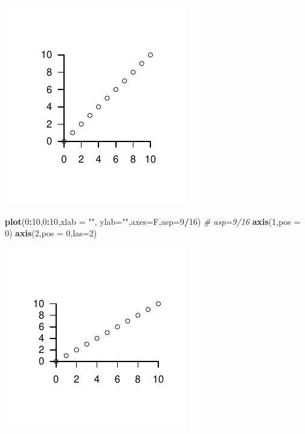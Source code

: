 \documentclass[
  11pt,
]{book}
\newenvironment{Shaded}{\begin{snugshade}}{\end{snugshade}}
\newcommand{\AttributeTok}[1]{\textcolor[rgb]{0.13,0.29,0.53}{#1}}
\newcommand{\CommentTok}[1]{\textcolor[rgb]{0.56,0.35,0.01}{\textit{#1}}}
\newcommand{\DecValTok}[1]{\textcolor[rgb]{0.00,0.00,0.81}{#1}}
\newcommand{\FunctionTok}[1]{\textcolor[rgb]{0.13,0.29,0.53}{\textbf{#1}}}
\newcommand{\NormalTok}[1]{#1}
\newcommand{\SpecialCharTok}[1]{\textcolor[rgb]{0.81,0.36,0.00}{\textbf{#1}}}
\newcommand{\StringTok}[1]{\textcolor[rgb]{0.31,0.60,0.02}{#1}}
\theoremstyle{mytheoremstyle}
\theoremstyle{mydefstyle}
\begin{document}
\begin{center}\includegraphics{Appunti_di_Statistica_2025_files/figure-latex/24-Libro-31,-1} \end{center}

\begin{Shaded}
\begin{Highlighting}[]
\FunctionTok{plot}\NormalTok{(}\DecValTok{0}\SpecialCharTok{:}\DecValTok{10}\NormalTok{,}\DecValTok{0}\SpecialCharTok{:}\DecValTok{10}\NormalTok{,}\AttributeTok{xlab =} \StringTok{""}\NormalTok{, }\AttributeTok{ylab=}\StringTok{""}\NormalTok{,}\AttributeTok{axes=}\NormalTok{F,}\AttributeTok{asp=}\DecValTok{9}\SpecialCharTok{/}\DecValTok{16}\NormalTok{) }\CommentTok{\# asp=9/16 }
\FunctionTok{axis}\NormalTok{(}\DecValTok{1}\NormalTok{,}\AttributeTok{pos =} \DecValTok{0}\NormalTok{)}
\FunctionTok{axis}\NormalTok{(}\DecValTok{2}\NormalTok{,}\AttributeTok{pos =} \DecValTok{0}\NormalTok{,}\AttributeTok{las=}\DecValTok{2}\NormalTok{)}
\end{Highlighting}
\end{Shaded}

\begin{center}\includegraphics{Appunti_di_Statistica_2025_files/figure-latex/24-Libro-32,-1} \end{center}
\end{document}
